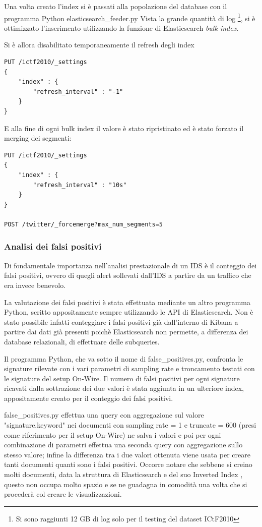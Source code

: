 \documentclass[12pt,a4paper,openright,twoside]{report}
\begin{document}
Una volta creato l'index si \`e passati alla popolazione del database con
il programma Python elasticsearch\_feeder.py
Vista la grande quantit\`a di log \footnote{Si sono raggiunti 12 GB di log solo per il
testing del dataset ICtF2010}, si \`e ottimizzato l'inserimento utilizzando la
funzione di Elasticsearch {\it bulk index}.

Si \`e allora disabilitato temporaneamente il refresh degli index \cite{EXP8} \cite{EXP9}
\begin{verbatim}
PUT /ictf2010/_settings
{
    "index" : {
        "refresh_interval" : "-1"
    }
}
\end{verbatim}

E alla fine di ogni bulk index il valore \`e stato ripristinato ed \`e stato forzato
il merging dei segmenti:
\begin{verbatim}
PUT /ictf2010/_settings
{
    "index" : {
        "refresh_interval" : "10s"
    }
}

POST /twitter/_forcemerge?max_num_segments=5
\end{verbatim}

\subsubsection{Analisi dei falsi positivi}

Di fondamentale importanza nell'analisi prestazionale di un IDS \`e il conteggio
dei falsi positivi, ovvero di quegli alert sollevati dall'IDS a partire da un traffico
che era invece benevolo.

La valutazione dei falsi positivi \`e stata effettuata mediante un altro programma
Python, scritto appositamente sempre utilizzando le API di Elasticsearch.
Non \`e stato possibile infatti conteggiare i falsi positivi gi\`a dall'interno di
Kibana a partire dai dati gi\`a presenti poich\`e Elasticsearch non permette, a
differenza dei database relazionali, di effettuare delle subqueries.

Il programma Python, che va sotto il nome di false\_positives.py, confronta le signature
rilevate con i vari parametri di sampling rate e troncamento testati con le signature
del setup On-Wire. Il numero di falsi positivi per ogni signature ricavati dalla sottrazione dei
due valori \`e stata aggiunta in un ulteriore index, appositamente creato per il conteggio
dei falsi positivi.

false\_positives.py effettua una query con aggregazione sul valore "signature.keyword" nei
documenti con sampling rate = 1 e truncate = 600 (presi come riferimento per il setup On-Wire)
ne salva i valori e poi per ogni combinazione
di parametri effettua una seconda query con aggregazione sullo stesso valore; infine la differenza
tra i due valori ottenuta viene usata per creare tanti documenti quanti sono i falsi positivi.
Occorre notare che sebbene si creino molti documenti, data la struttura di Elasticsearch
e del suo Inverted Index \cite{EXP13}, questo non occupa molto spazio e se ne guadagna in comodit\`a una volta che
si proceder\`a col creare le visualizzazioni.
\end{document}
